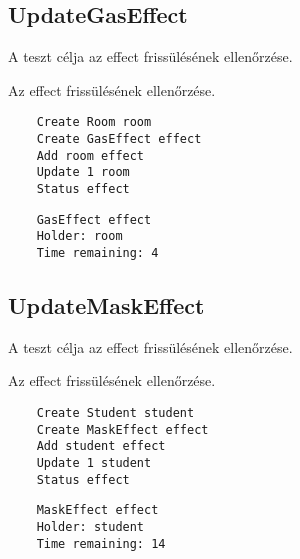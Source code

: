 \subsection{UpdateGasEffect}
\begin{test-case-description}
    A teszt célja az effect frissülésének ellenőrzése.
\end{test-case-description}
\begin{test-case-function}
    Az effect frissülésének ellenőrzése.
\end{test-case-function}
\begin{test-case-input}
    \begin{verbatim}
    Create Room room
    Create GasEffect effect
    Add room effect
    Update 1 room
    Status effect
    \end{verbatim}
\end{test-case-input}
\begin{test-case-output}
    \begin{verbatim}
    GasEffect effect
    Holder: room
    Time remaining: 4
    \end{verbatim}
\end{test-case-output}

\subsection{UpdateMaskEffect}
\begin{test-case-description}
    A teszt célja az effect frissülésének ellenőrzése.
\end{test-case-description}
\begin{test-case-function}
    Az effect frissülésének ellenőrzése.
\end{test-case-function}
\begin{test-case-input}
    \begin{verbatim}
    Create Student student
    Create MaskEffect effect
    Add student effect
    Update 1 student
    Status effect
    \end{verbatim}
\end{test-case-input}
\begin{test-case-output}
    \begin{verbatim}
    MaskEffect effect
    Holder: student
    Time remaining: 14
    \end{verbatim}
\end{test-case-output}

